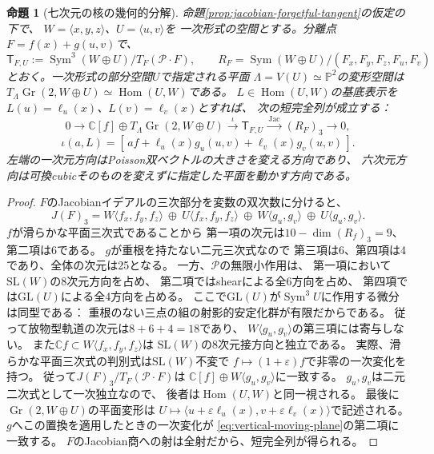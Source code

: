 \documentclass[11pt,a4paper]{ltjsarticle}
\numberwithin{equation}{section}
\newtheorem{proposition}[theorem]{命題}
\newcommand{\PP}{\mathbb P}
\newcommand{\Sym}{\operatorname{Sym}}
\begin{document}
\begin{proposition}[七次元の核の幾何的分解]\label{prop:vertical-seven}
命題\ref{prop:jacobian-forgetful-tangent}の仮定の下で、
$W=\langle x,y,z\rangle$、$U=\langle u,v\rangle$を
\emph{一次形式の空間}とする。分離点$F=f(x)+g(u,v)$で、
\[
 \mathsf T_{F,U}:=\Sym^3(W\oplus U)/T_F(\mathcal P\cdot F),
 \qquad R_F=\Sym(W\oplus U)/(F_x,F_y,F_z,F_u,F_v)
\]
とおく。一次形式の部分空間$U$で指定される平面
$\Lambda=V(U)\simeq\PP^2$の変形空間は
$T_{\Lambda}\operatorname{Gr}(2,W\oplus U)
\simeq\operatorname{Hom}(U,W)$である。
$L\in\operatorname{Hom}(U,W)$の基底表示を
$L(u)=\ell_u(x)$、$L(v)=\ell_v(x)$とすれば、
次の短完全列が成立する：
\[
 0\longrightarrow
 \mathbb C[f]\oplus T_{\Lambda}\operatorname{Gr}(2,W\oplus U)
 \xrightarrow{\ \iota\ } \mathsf T_{F,U}
 \xrightarrow{\ \mathrm{Jac}\ } (R_F)_3
 \longrightarrow0,
 \tag{V}\label{eq:vertical-seven-exact}
\]
\[
 \iota(a,L)=[\,a f+\ell_u(x)g_u(u,v)+\ell_v(x)g_v(u,v)\,].
 \tag{VM}\label{eq:vertical-moving-plane}
\]
左端の一次元方向はPoisson双ベクトルの大きさを変える方向であり、
六次元方向は可換cubicそのものを変えずに指定した平面を動かす方向である。
\end{proposition}
\begin{proof}
$F$のJacobianイデアルの三次部分を変数の双次数に分けると、
\[
 J(F)_3=
 W\langle f_x,f_y,f_z\rangle\ \oplus\
 U\langle f_x,f_y,f_z\rangle\ \oplus\
 W\langle g_u,g_v\rangle\ \oplus\
 U\langle g_u,g_v\rangle.
\]
$f$が滑らかな平面三次式であることから
第一項の次元は$10-\dim(R_f)_3=9$、第二項は6である。
$g$が重根を持たない二元三次式なので
第三項は6、第四項は4であり、全体の次元は25となる。
一方、$\mathcal P$の無限小作用は、
第一項において$\mathrm{SL}(W)$の8次元方向を占め、
第二項ではshearによる全6方向を占め、
第四項では$\mathrm{GL}(U)$による全4方向を占める。
ここで$\mathrm{GL}(U)$が$\Sym^3U$に作用する微分は同型である：
重根のない三点の組の射影的安定化群が有限だからである。
従って放物型軌道の次元は$8+6+4=18$であり、
$W\langle g_u,g_v\rangle$の第三項には寄与しない。
また$\mathbb Cf\subset W\langle f_x,f_y,f_z\rangle$は
$\mathrm{SL}(W)$の8次元接方向と独立である。
実際、滑らかな平面三次式の判別式は$\mathrm{SL}(W)$不変で
$f\mapsto(1+\varepsilon)f$で非零の一次変化を持つ。
従って$J(F)_3/T_F(\mathcal P\cdot F)$は
$\mathbb C[f]\oplus W\langle g_u,g_v\rangle$に一致する。
$g_u,g_v$は二元二次式として一次独立なので、
後者は$\operatorname{Hom}(U,W)$と同一視される。
最後に$\operatorname{Gr}(2,W\oplus U)$の平面変形は
$U\mapsto\langle u+\varepsilon\ell_u(x),
 v+\varepsilon\ell_v(x)\rangle$で記述される。
$g$へこの置換を適用したときの一次変化が
\eqref{eq:vertical-moving-plane}の第二項に一致する。
$F$のJacobian商への射は全射だから、短完全列が得られる。
\end{proof}
\end{document}
